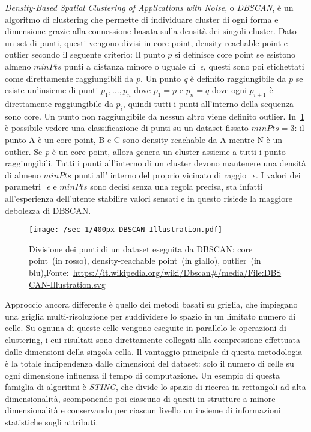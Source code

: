 \textit{Density-Based Spatial Clustering of Applications with Noise}, o \textit{DBSCAN}, è un algoritmo
di clustering che permette di individuare cluster di ogni forma e dimensione grazie alla connessione basata sulla densità dei singoli cluster.
Dato un set di punti, questi vengono divisi in core point, density-reachable point e outlier secondo il seguente criterio:
Il punto \(p\) si definisce core point se esistono almeno \(minPts\) punti a distanza minore o uguale di
\(~\epsilon \), questi sono poi etichettati come direttamente raggiungibili da \(p\).
Un punto \textit{q} è definito raggiungibile da \(p\) se esiste un'insieme di punti
\(p_{1},\ldots, p_{n}\) dove \(p_{1} = p \) e
\(p_{n} = q \) dove ogni \(p_{i + 1}\) è direttamente raggiungibile da
\(p_{i}\), quindi tutti i punti all'interno della sequenza sono core.
Un punto non raggiungibile da nessun altro viene definito outlier.
In~\cref*{fig:chap-1:dbscan-points} è possibile vedere una classificazione di punti su un dataset fissato
\(minPts=3\): il punto A è un core point, B e C sono density-reachable da A mentre N è un outlier.
Se \textit{p} è un core point, allora genera un cluster assieme a tutti i punto raggiungibili.
Tutti i punti all'interno di un cluster devono mantenere una densità di almeno \(minPts\) punti all'
interno del proprio vicinato di raggio~\(~\epsilon \).
I valori dei parametri~\(~\epsilon \) e \(minPts\) sono decisi senza una regola precisa, sta infatti all'esperienza dell'utente stabilire valori sensati e in questo risiede la maggiore debolezza di DBSCAN\@.

\begin{figure}
  \centering
  \texttt{[image: /sec-1/400px-DBSCAN-Illustration.pdf]}
  \caption{Divisione dei punti di un dataset eseguita da DBSCAN\@: core point~(in rosso), density-reachable point~(in giallo), outlier~(in blu),Fonte:~\url{https://it.wikipedia.org/wiki/Dbscan\#/media/File:DBSCAN-Illustration.svg}}%
  \label{fig:chap-1:dbscan-points}
\end{figure}

Approccio ancora differente è quello dei metodi basati su griglia, che impiegano una griglia multi-risoluzione
per suddividere lo spazio in un limitato numero di celle.
Su ognuna di queste celle vengono eseguite in parallelo le operazioni di clustering, i cui risultati sono direttamente collegati alla compressione
effettuata dalle dimensioni della singola cella.
Il vantaggio principale di questa metodologia è la totale indipendenza dalle dimensioni del dataset: solo il numero di
celle su ogni dimensione influenza il tempo di computazione.
Un esempio di questa famiglia di algoritmi è \textit{STING}\cite{wang1997sting},
che divide lo spazio di ricerca in rettangoli ad alta dimensionalità, scomponendo poi ciascuno di questi
in strutture a minore dimensionalità e conservando per ciascun livello un insieme di informazioni statistiche sugli attributi.

